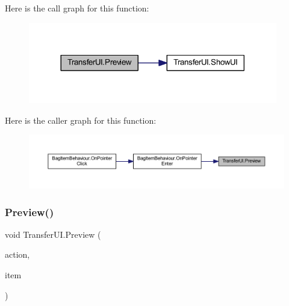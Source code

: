Here is the call graph for this function\+:\nopagebreak
\begin{figure}[H]
\begin{center}
\leavevmode
\includegraphics[width=308pt]{class_transfer_u_i_a9d2e7c3708193e3d51fe8539f9c41a75_cgraph}
\end{center}
\end{figure}
Here is the caller graph for this function\+:\nopagebreak
\begin{figure}[H]
\begin{center}
\leavevmode
\includegraphics[width=350pt]{class_transfer_u_i_a9d2e7c3708193e3d51fe8539f9c41a75_icgraph}
\end{center}
\end{figure}
\mbox{\label{class_transfer_u_i_a52bd586cae27d6570e207d856457a116}} 
\subsubsection{\texorpdfstring{Preview()}{Preview()}\hspace{0.1cm}{\footnotesize\ttfamily [2/2]}}
{\footnotesize\ttfamily void Transfer\+U\+I.\+Preview (\begin{DoxyParamCaption}\item[{\mbox{\hyperlink{class_container_behaviour_a8ad6b6c9b34c2e0abdaaf0627f87b036}{Container\+Behaviour.\+Actions}}}]{action,  }\item[{\mbox{\hyperlink{class_base_item}{Base\+Item}}}]{item }\end{DoxyParamCaption})}

